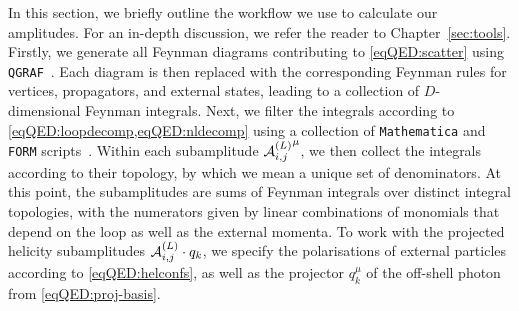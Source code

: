 \documentclass[main.tex]{subfiles}
\begin{document}
In this section, we briefly outline the workflow we use to calculate our amplitudes. For an in-depth discussion, we refer the reader to Chapter~\ref{sec:tools}. Firstly, we generate all Feynman diagrams contributing to \cref{eqQED:scatter} using \texttt{QGRAF}~\cite{Nogueira:1991ex}. Each diagram is then replaced with the corresponding Feynman rules for vertices, propagators, and external states, leading to a collection of $D$-dimensional Feynman integrals. Next, we filter the integrals according to \cref{eqQED:loopdecomp,eqQED:nldecomp} using a collection of \texttt{Mathematica} and \texttt{FORM} scripts~\cite{Kuipers:2012rf,
Ruijl:2017dtg}. Within each subamplitude ${\mathcal{A}^{(L)}_{i, j}}^{\mu}$, we then collect the integrals according to their topology, by which we mean a unique set of denominators. At this point, the subamplitudes are sums of Feynman integrals over distinct integral topologies, with the numerators given by linear combinations of monomials that depend on the loop as well as the external momenta. To work with the projected helicity subamplitudes $\mathcal{A}^{(L)}_{i,j}\cdot q_k$, we specify the polarisations of external particles according to \cref{eqQED:helconfs}, as well as the projector $q_k^\mu$ of the off-shell photon from \cref{eqQED:proj-basis}. 
\end{document}
